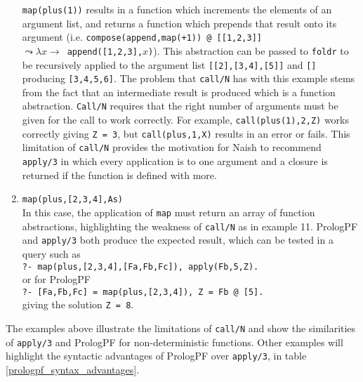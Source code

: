 \begin{enumerate}
{  \texttt{map(plus(1))} results in a function which increments the elements of an
  argument list, and returns a function which prepends that result onto its
  argument (i.e. \texttt{compose(append,map(+1)) @ [[1,2,3]]} \\
  \mbox{$\leadsto \lambda x \rightarrow$ \texttt{append([1,2,3],$x$)}}).  This abstraction
  can be passed to \texttt{foldr} to be recursively applied to the argument list
  \texttt{[[2],[3,4],[5]]} and \texttt{[]} producing \texttt{[3,4,5,6]}.
  The problem that \texttt{call/N} has with this example stems from the fact that
  an intermediate result is produced which is a function abstraction.
  \texttt{Call/N} requires that the right number of arguments must be given for the
  call to work correctly.  For example, \texttt{call(plus(1),2,Z)} works correctly
  giving \texttt{Z = 3}, but \texttt{call(plus,1,X)} results in an error or fails.
  This limitation of \texttt{call/N} provides the motivation for Naish \cite{Nai96}
  to recommend \texttt{apply/3} in which every application is to one argument and
  a closure is returned if the function is defined with more.}
\item{\texttt{map(plus,[2,3,4],As)}\\
  In this case, the application of \texttt{map} must return an array of
  function abstractions, highlighting the weakness of \texttt{call/N} as in example
  11.  PrologPF and \texttt{apply/3} both produce the expected result, which can be tested 
  in a query such as\\
  \mbox{\texttt{?- map(plus,[2,3,4],[Fa,Fb,Fc]), apply(Fb,5,Z).}}\\ or for PrologPF\\
  \mbox{\texttt{?- [Fa,Fb,Fc] = map(plus,[2,3,4]), Z = Fb @ [5].}}\\ giving the
  solution \mbox{\texttt{Z = 8}}.}
\end{enumerate}

The examples above illustrate the limitations of \texttt{call/N} and show the similarities
of \texttt{apply/3} and PrologPF for non-deterministic functions.  Other examples will highlight
the syntactic advantages of PrologPF over \texttt{apply/3}, in
table \ref{prologpf_syntax_advantages}.

